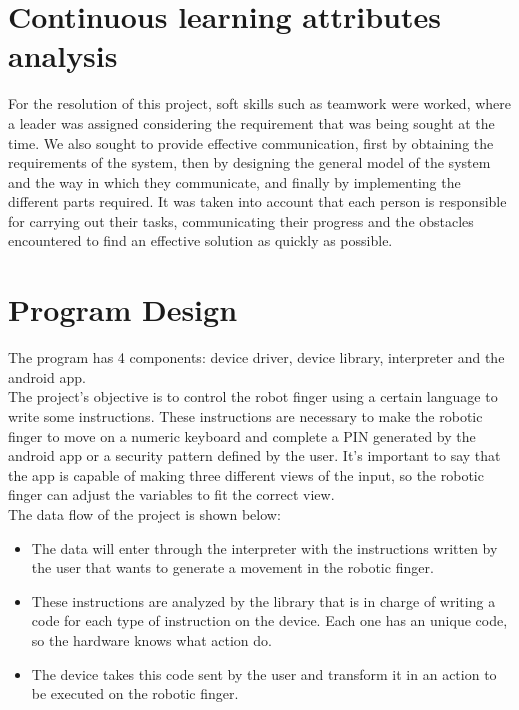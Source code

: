 \documentclass[12pt,twoside]{article}
\begin{document}
\newpage

\section{Continuous learning attributes analysis}

For the resolution of this project, soft skills such as teamwork were worked, where a leader was assigned considering the requirement that was being sought at the time. We also sought to provide effective communication, first by obtaining the requirements of the system, then by designing the general model of the system and the way in which they communicate, and finally by implementing the different parts required. It was taken into account that each person is responsible for carrying out their tasks, communicating their progress and the obstacles encountered to find an effective solution as quickly as possible.

\newpage

\section{Program Design}

The program has 4 components: device driver, device library, interpreter and the android app. \\
The project's objective is to control the robot finger using a certain language to write some instructions. These instructions are necessary to make the robotic finger to move on a numeric keyboard and complete a PIN generated by the android app or a security pattern defined by the user. It's important to say that the app is capable of making three different views of the input, so the robotic finger can adjust the variables to fit the correct view. \\

The data flow of the project is shown below:
\begin{itemize}
\item The data will enter through the interpreter with the instructions written by the user that wants to generate a movement in the robotic finger.
\item These instructions are analyzed by the library that is in charge of writing a code for each type of instruction on the device. Each one has an unique code, so the hardware knows what action do.
\item The device takes this code sent by the user and transform it in an action to be executed on the robotic finger.
\end{itemize}
\end{document}
